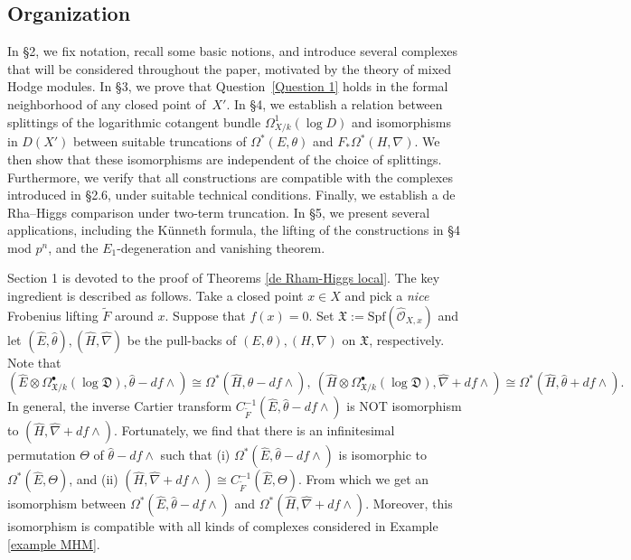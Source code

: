 \documentclass[12pt, a4paper]{article}
\begin{document}
\subsection{Organization}
In \S2, we fix notation, recall some basic notions, and introduce several complexes that will be considered throughout the paper, motivated by the theory of mixed Hodge modules. In \S3, we prove that Question~\ref{Question 1} holds in the formal neighborhood of any closed point of~$X'$. In \S4, we establish a relation between splittings of the logarithmic cotangent bundle $\Omega^1_{X/k}(\log D)$ and isomorphisms in $D(X')$ between suitable truncations of $\Omega^*(E,\theta)$ and $F_*\Omega^*(H,\nabla)$. We then show that these isomorphisms are independent of the choice of splittings. Furthermore, we verify that all constructions are compatible with the complexes introduced in \S2.6, under suitable technical conditions. Finally, we establish a de Rha–Higgs comparison under two-term truncation. In \S5, we present several applications, including the K\"unneth formula, the lifting of the constructions in \S4 mod $p^n$, and the $E_1$-degeneration and vanishing theorem.







\iffalse
Section 1  is devoted to the proof of Theorems \ref{de Rham-Higgs local}. The key ingredient is described as follows. Take a closed point $x\in X$ and pick a \emph{nice} Frobenius lifting $\tilde F$ around $x$. Suppose that $f(x)=0$. Set $\mathfrak X:=\mathrm{Spf}(\hat{\mathcal O}_{X,x})$ and let $(\hat E,\hat\theta),(\hat H,\hat\nabla)$ be the pull-backs of $(E,\theta),(H,\nabla)$ on $\mathfrak X$, respectively. Note that 
$$
(\hat E\otimes\Omega^\bullet_{\mathfrak X/k}(\log\mathfrak D),\hat\theta-df\wedge)\cong\Omega^*(\hat H,\hat\theta-df\wedge),~(\hat H\otimes\Omega^\bullet_{\mathfrak X/k}(\log\mathfrak D),\hat\nabla+df\wedge)\cong\Omega^*(\hat H,\hat\theta+df\wedge).
$$
In general, the inverse Cartier transform   $C^{-1}_{\tilde F}(\hat E,\hat\theta-df\wedge)$ is NOT isomorphism to $(\hat H,\hat\nabla+df\wedge)$. Fortunately, we find that there is an infinitesimal permutation $\Theta$ of $\hat\theta-df\wedge$ such that (i) $\Omega^*(\hat E,\hat\theta-df\wedge)$ is isomorphic to $\Omega^*(\hat E,\Theta)$, and (ii) $(\hat H,\hat\nabla+df\wedge)\cong C^{-1}_{\tilde F}(\hat E,\Theta)$. From which we get an isomorphism between $\Omega^*(\hat E,\hat\theta-df\wedge)$ and $\Omega^*(\hat H,\hat\nabla+df\wedge)$. Moreover, this isomorphism is compatible with all kinds of complexes considered in Example \ref{example MHM}.
\end{document}
